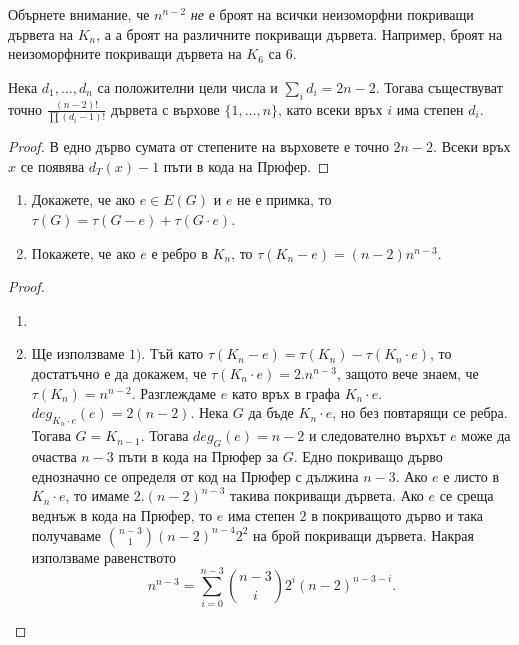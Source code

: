 \begin{remark}
  Обърнете внимание, че $n^{n-2}$ {\em не} е броят на всички неизоморфни покриващи дървета на $K_n$, а
  а броят на различните покриващи дървета. Например, броят на неизоморфните покриващи дървета на $K_6$
  са 6.
\end{remark}

\begin{corollary}
  Нека $d_1,\dots, d_n$ са положителни цели числа и $\sum_i d_i = 2n - 2$.
  Тогава съществуват точно $\frac{(n-2)!}{\prod(d_i - 1)!}$ дървета с върхове $\{1,\dots,n\}$, 
  като всеки връх $i$ има степен $d_i$.
\end{corollary}
\begin{proof}
  В едно дърво сумата от степените на върховете е точно $2n - 2$.
  Всеки връх $x$ се появява $d_T(x) - 1$ пъти в кода на Прюфер.
\end{proof}



\begin{problem}
  \begin{enumerate}[1)]
  \item
    Докажете, че ако $e\in E(G)$ и $e$ не е примка, то
    $\tau(G) = \tau(G - e) + \tau(G\cdot e)$.
  \item
    Покажете, че ако $e$ е ребро в $K_n$, то $\tau(K_n - e) = (n-2)n^{n-3}$.
  \end{enumerate}
\end{problem}
\begin{proof}
  \begin{enumerate}[1)]
  \item
    
  \item
    Ще използваме $1)$.
    Тъй като $\tau(K_n - e) = \tau(K_n) - \tau(K_n\cdot e)$, то достатъчно е да докажем, че
    $\tau(K_n\cdot e) = 2.n^{n-3}$, защото вече знаем, че $\tau(K_n) = n^{n-2}$.
    Разглеждаме $e$ като връх в графа $K_n\cdot e$.
    $deg_{K_n\cdot e}(e) = 2(n-2)$.
    Нека $G$ да бъде $K_n\cdot e$, но без повтарящи се ребра.
    Тогава $G = K_{n-1}$.
    Тогава $deg_G(e) = n-2$ и следователно върхът $e$ може да очаства
    $n-3$ пъти в кода на Прюфер за $G$.
    Едно покриващо дърво еднозначно се определя от код на Прюфер с дължина $n-3$.
    Ако $e$ е листо в $K_n\cdot e$, то имаме $2.(n-2)^{n-3}$ такива покриващи дървета.
    Ако $e$ се среща веднъж в кода на Прюфер, то $e$ има степен $2$ в покриващото дърво
    и така получаваме
    $\binom{n-3}{1}(n-2)^{n-4}2^2$ на брой покриващи дървета.
    Накрая използваме равенството
    \[n^{n-3} = \sum^{n-3}_{i=0}\binom{n-3}{i}2^i(n-2)^{n-3-i}.\]
\end{enumerate}

\end{proof}


